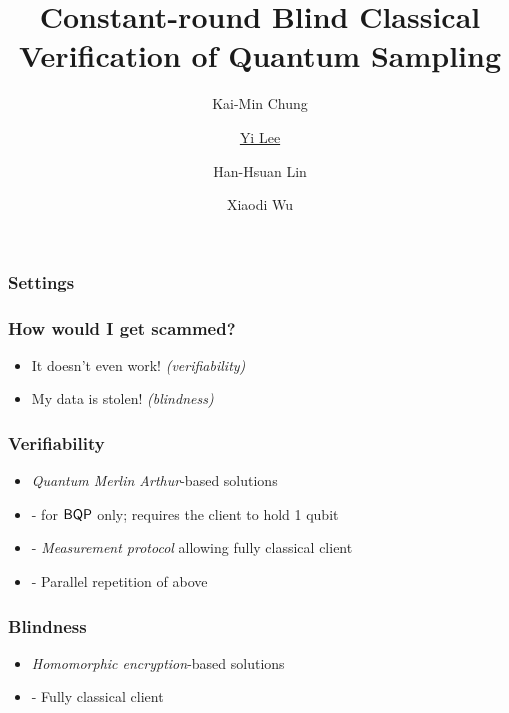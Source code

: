 \documentclass{beamer}
\title{Constant-round Blind Classical Verification of Quantum Sampling}
\author{Kai-Min Chung \and \underline{Yi Lee} \and Han-Hsuan Lin \and Xiaodi Wu}
\begin{document}
\begin{frame}
	\titlepage
\end{frame}

\begin{frame}
	\frametitle{Settings}


	\begin{flushright}
	\end{flushright}
\end{frame}

\begin{frame}
	\frametitle{How would I get scammed?}
	\begin{itemize}
		\item It doesn't even work! \emph{(verifiability)}
		\item My data is stolen! \emph{(blindness)}
	\end{itemize}
\end{frame}

\begin{frame}
	\frametitle{Verifiability}
	\begin{itemize}[<+->]
		\item \emph{Quantum Merlin Arthur}-based solutions
		\item \cite{mf16} - for $\operatorname{\mathsf{BQP}}$ only; requires the client to hold 1 qubit
		\item \cite{FOCS:Mahadev18a} - \emph{Measurement protocol} allowing fully classical client
		\item \cite{arXiv:ChiaChungYam19} - Parallel repetition of above
	\end{itemize}
\end{frame}

\begin{frame}
	\frametitle{Blindness}
	\begin{itemize}[<+->]
		\item \emph{Homomorphic encryption}-based solutions
		\item \cite{mahadev_qfhe} - Fully classical client
	\end{itemize}
\end{frame}
\end{document}
